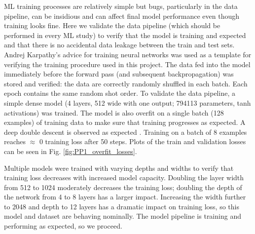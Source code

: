 ML training processes are relatively simple but bugs, particularly in the data pipeline, can be insidious and can affect final model performance even though training looks fine. Here we validate the data pipeline (which should be performed in every ML study) to verify that the model is training and expected and that there is no accidental data leakage between the train and test sets. Andrej Karpathy's advice for training neural networks \cite{karpathy_recipe_2019} was used as a template for verifying the training procedure used in this project. The data fed into the model immediately before the forward pass (and subsequent backpropagation) was stored and verified: the data are correctly randomly shuffled in each batch. Each epoch contains the same random shot order. To validate the data pipeline, a simple dense model (4 layers, 512 wide with one output; 794113 parameters, tanh activations) was trained. The model is also overfit on a single batch (128 examples) of training data to make sure that training progresses as expected. A deep double descent is observed as expected \cite{nakkiran_deep_2019,schaeffer_double_2023}. Training on a batch of 8 examples reaches $\approx$ 0 training loss after 50 steps. Plots of the train and validation losses can be seen in Fig. \ref{fig:PP1_overfit_losses}.

Multiple models were trained with varying depths and widths to verify that training loss decreases with increased model capacity. Doubling the layer width from 512 to 1024 moderately decreases the training loss; doubling the depth of the network from 4 to 8 layers has a larger impact. Increasing the width further to 2048 and depth to 12 layers has a dramatic impact on training loss, so this model and dataset are behaving nominally. The model pipeline is training and performing as expected, so we proceed.

